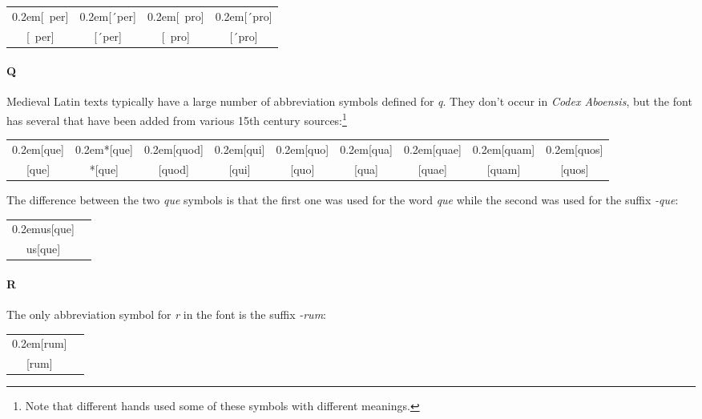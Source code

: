 \documentclass[a4paper]{article}
\newcommand{\samplefont}{\fontsize{16}{16}\abcursivefamily\spaceskip0.2em}
\newcommand{\sample}[1]{{\samplefont #1 \strut}}
\begin{document}
\begin{center}
  \begin{tabular}{cccc}
    \sample{[~per]} & \sample{[´per]} &  \sample{[~pro]} &
    \sample{[´pro]} \\
    {}[~per] & [´per] &  [~pro] & [´pro]
  \end{tabular}
\end{center}

\paragraph{Q} Medieval Latin texts typically have a large number of
abbreviation symbols defined for \emph{q}. They don't occur in
\emph{Codex Aboensis}, but the font has several that have been added
from various 15th century sources:\footnote{Note that different hands
  used some of these symbols with different meanings.}

\begin{center}
  \begin{tabular}{ccccccccc}
    \sample{[que]} & \sample{*[que]} &  \sample{[quod]} & \sample{[qui]} &
     \sample{[quo]} & \sample{[qua]} &
     \sample{[quae]}
     &  \sample{[quam]} & \sample{[quos]} \\
     {}[que] & *[que] & [quod] & [qui] & [quo] & [qua] & [quae] & 
     [quam] & [quos] 
  \end{tabular}
\end{center}


The difference between the two \emph{que} symbols is that the first
one was used for the word \emph{que} while the second was used for the
suffix \emph{-que}: 

\begin{center}
  \begin{tabular}{cc}
    \sample{us[que]} \\
    us[que]
  \end{tabular}
\end{center}

\paragraph{R}

The only abbreviation symbol for \emph{r} in the font is the suffix
\emph{-rum}:

\begin{center}
  \begin{tabular}{cc}
    \sample{[rum]} \\
    {}[rum]
  \end{tabular}
\end{center}
\end{document}
